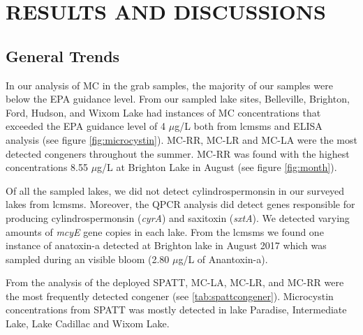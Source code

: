 \chapter{RESULTS AND DISCUSSIONS}
\section{General Trends}

In our analysis of MC in the grab samples, the majority of our samples were below the EPA guidance level. From our sampled lake sites, Belleville, Brighton, Ford, Hudson, and Wixom Lake had instances of MC concentrations that exceeded the EPA guidance level of 4 $\mu$g/L both from \gls{lcmsms} and ELISA analysis (see figure \ref{fig:microcystin}). MC-RR, MC-LR and MC-LA were the most detected congeners throughout the summer.  MC-RR was found with the highest concentrations 8.55 $\mu$g/L at Brighton Lake in August (see figure \ref{fig:month}).  

Of all the sampled lakes, we did not detect cylindrospermonsin in our surveyed lakes from \gls{lcmsms}. Moreover, the QPCR analysis did detect genes responsible for producing cylindrospermonsin (\emph{cyrA}) and saxitoxin (\emph{sxtA}). We detected varying amounts of \emph{mcyE} gene copies in each lake.  From the \gls{lcmsms} we found one instance of anatoxin-a detected at Brighton lake in August 2017 which was sampled during an visible bloom (2.80 $\mu$g/L of Anantoxin-a).

From the analysis of the deployed SPATT, MC-LA, MC-LR, and MC-RR were the most frequently detected congener (see \ref{tab:spattcongener}). Microcystin concentrations from SPATT was mostly detected in lake Paradise, Intermediate Lake, Lake Cadillac and Wixom Lake.  


